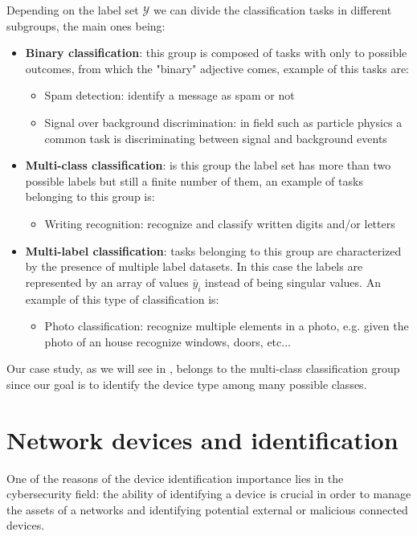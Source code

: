 Depending on the label set $\mathcal{Y}$ we can divide the classification tasks in different subgroups, the main ones being:
\begin{itemize}
    \item \textbf{Binary classification}: this group is composed of tasks with only to possible outcomes, from which the "binary" adjective comes, example of this tasks are:
    \begin{itemize}
        \item Spam detection: identify a message as spam or not
    \item Signal over background discrimination: in field such as particle physics a common task is discriminating between signal and background events
    \end{itemize}
    \item \textbf{Multi-class classification}: is this group the label set has more than two possible labels but still a finite number of them, an example of tasks belonging to this group is:
    \begin{itemize}
        \item Writing recognition: recognize and classify written digits and/or letters
    \end{itemize}
    \item \textbf{Multi-label classification}: tasks belonging to this group are characterized by the presence of multiple label
    datasets. In this case the labels are represented by an array of values $\bar{y}_i$ instead of being singular values. An example of this type of classification is:
    \begin{itemize}
        \item Photo classification: recognize multiple elements in a photo, e.g. given the photo of an house recognize windows, doors, etc...
    \end{itemize}
\end{itemize}

Our case study, as we will see in , belongs to the multi-class classification group since our goal is to identify the device type among many possible classes. 


\section{Network devices and identification}\label{identification}

One of the reasons of the device identification importance lies in the cybersecurity field: the ability of identifying a device is crucial in order to manage the assets of a networks and identifying potential external or malicious connected devices.

